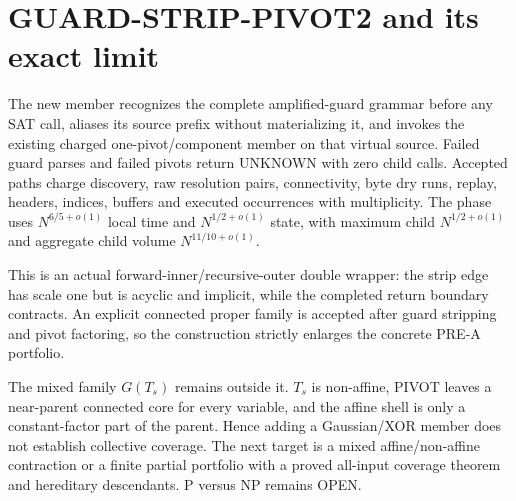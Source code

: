 \section{GUARD-STRIP-PIVOT2 and its exact limit}
The new member recognizes the complete amplified-guard grammar before any
SAT call, aliases its source prefix without materializing it, and invokes the
existing charged one-pivot/component member on that virtual source.  Failed
guard parses and failed pivots return UNKNOWN with zero child calls.  Accepted
paths charge discovery, raw resolution pairs, connectivity, byte dry runs,
replay, headers, indices, buffers and executed occurrences with multiplicity.
The phase uses $N^{6/5+o(1)}$ local time and $N^{1/2+o(1)}$ state, with
maximum child $N^{1/2+o(1)}$ and aggregate child volume
$N^{11/10+o(1)}$.

This is an actual forward-inner/recursive-outer double wrapper: the strip
edge has scale one but is acyclic and implicit, while the completed return
boundary contracts.  An explicit connected proper family is accepted after
guard stripping and pivot factoring, so the construction strictly enlarges
the concrete PRE-A portfolio.

The mixed family $G(T_s)$ remains outside it.  $T_s$ is non-affine, PIVOT
leaves a near-parent connected core for every variable, and the affine shell
is only a constant-factor part of the parent.  Hence adding a Gaussian/XOR
member does not establish collective coverage.  The next target is a mixed
affine/non-affine contraction or a finite partial portfolio with a proved
all-input coverage theorem and hereditary descendants.  P versus NP remains
OPEN.
